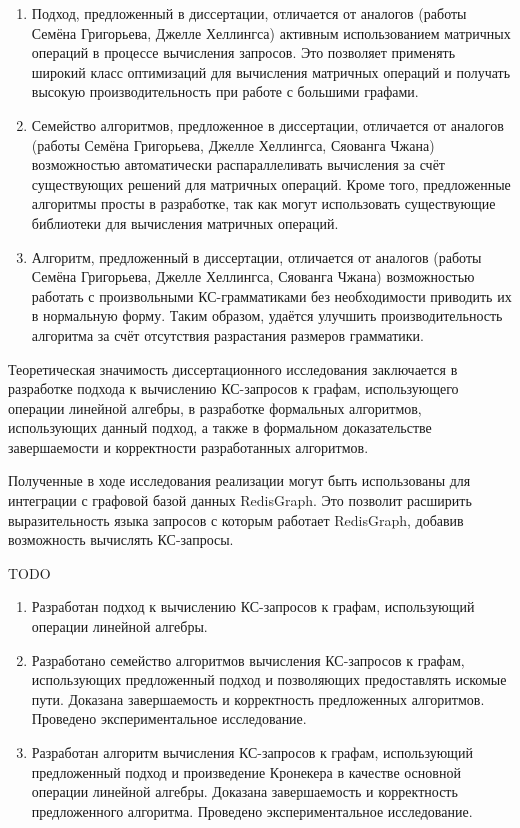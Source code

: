 {\novelty}
\begin{enumerate}[beginpenalty=10000] %
	
	\item Подход, предложенный в диссертации, отличается от аналогов (работы Семёна Григорьева, Джелле Хеллингса) активным использованием матричных операций в процессе вычисления запросов. Это позволяет применять широкий класс оптимизаций для вычисления матричных операций и получать высокую производительность при работе с большими графами.
	
	\item Семейство алгоритмов, предложенное в диссертации, отличается от аналогов (работы Семёна Григорьева, Джелле Хеллингса, Сяованга Чжана) возможностью автоматически распараллеливать вычисления за счёт существующих решений для матричных операций. Кроме того, предложенные алгоритмы просты в разработке, так как могут использовать существующие библиотеки для вычисления матричных операций.
	
	\item Алгоритм, предложенный в диссертации, отличается от аналогов (работы Семёна Григорьева, Джелле Хеллингса, Сяованга Чжана) возможностью работать с произвольными КС-грамматиками без необходимости приводить их в нормальную форму. Таким образом, удаётся улучшить производительность алгоритма за счёт отсутствия разрастания размеров грамматики.
	
\end{enumerate}

{\influence} 

Теоретическая значимость диссертационного исследования заключается в разработке подхода к вычислению КС-запросов к графам, использующего операции линейной алгебры, в разработке формальных алгоритмов, использующих данный подход, а также в формальном доказательстве завершаемости и корректности разработанных алгоритмов.

Полученные в ходе исследования реализации могут быть использованы для интеграции с графовой базой данных RedisGraph. Это позволит расширить выразительность языка запросов с которым работает RedisGraph, добавив возможность вычислять КС-запросы.

{\methods} TODO

{}
\begin{enumerate}[beginpenalty=10000] %
	\item Разработан подход к вычислению КС-запросов к графам, использующий операции линейной алгебры.
	\item Разработано семейство алгоритмов вычисления КС-запросов к графам, использующих предложенный подход и позволяющих предоставлять искомые пути. Доказана завершаемость и корректность предложенных алгоритмов. Проведено экспериментальное исследование.
	\item Разработан алгоритм вычисления КС-запросов к графам, использующий предложенный подход и произведение Кронекера в качестве основной операции линейной алгебры. Доказана завершаемость и корректность предложенного алгоритма. Проведено экспериментальное исследование.
\end{enumerate}

